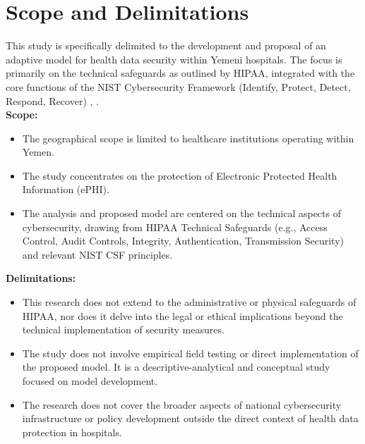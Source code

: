 \documentclass[12pt, a4paper, oneside]{report}
\begin{document}
	\section{Scope and Delimitations}
	This study is specifically delimited to the development and proposal of an adaptive model for health data security within Yemeni hospitals. The focus is primarily on the technical safeguards as outlined by HIPAA, integrated with the core functions of the NIST Cybersecurity Framework (Identify, Protect, Detect, Respond, Recover) \cite{hhs2024hipaa}, \cite{rahmany2026aida}. \\
	\textbf{Scope:}
	\begin{itemize}
		\item The geographical scope is limited to healthcare institutions operating within Yemen.
		\item The study concentrates on the protection of Electronic Protected Health Information (ePHI).
		\item The analysis and proposed model are centered on the technical aspects of cybersecurity, drawing from HIPAA Technical Safeguards (e.g., Access Control, Audit Controls, Integrity, Authentication, Transmission Security) and relevant NIST CSF principles.
	\end{itemize}
	\textbf{Delimitations:}
	\begin{itemize}
		\item This research does not extend to the administrative or physical safeguards of HIPAA, nor does it delve into the legal or ethical implications beyond the technical implementation of security measures.
		\item The study does not involve empirical field testing or direct implementation of the proposed model. It is a descriptive-analytical and conceptual study focused on model development.
		\item The research does not cover the broader aspects of national cybersecurity infrastructure or policy development outside the direct context of health data protection in hospitals.
	\end{itemize}
	
\end{document}
